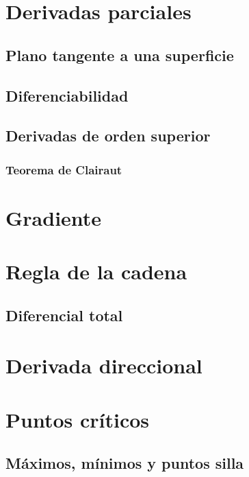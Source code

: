 \documentclass[12pt, fleqn]{report}                             %
\begin{document}
		\section{Derivadas parciales}
		
			\subsection{Plano tangente a una superficie}
			
			\subsection{Diferenciabilidad}
			
			\subsection{Derivadas de orden superior}
			
				\subsubsection{Teorema de Clairaut}
				
		\section{Gradiente}
				
		\section{Regla de la cadena}
		
			\subsection{Diferencial total}
			
		\section{Derivada direccional}
		
		\section{Puntos críticos}
		
			\subsection{Máximos, mínimos y puntos silla}
			
\end{document}
